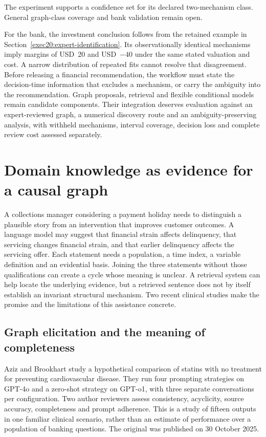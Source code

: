 The experiment supports a confidence set for its declared two-mechanism
class. General graph-class coverage and bank validation remain open.

For the bank, the investment conclusion follows from the retained example in
Section~\ref{exec20:expert-identification}. Its observationally identical
mechanisms imply margins of USD~20 and USD~$-40$ under the same stated
valuation and cost. A narrow distribution of repeated fits cannot resolve
that disagreement. Before releasing a financial recommendation, the workflow
must state the decision-time information that excludes a mechanism, or carry
the ambiguity into the recommendation. Graph proposals, retrieval and flexible
conditional models remain candidate components. Their integration deserves
evaluation against an expert-reviewed graph, a numerical discovery route and
an ambiguity-preserving analysis, with withheld mechanisms, interval coverage,
decision loss and complete review cost assessed separately.


\section{Domain knowledge as evidence for a causal graph}
\label{exec22:domain-scope}

A collections manager considering a payment holiday needs to distinguish a
plausible story from an intervention that improves customer outcomes. A language
model may suggest that financial strain affects delinquency, that servicing
changes financial strain, and that earlier delinquency affects the servicing
offer. Each statement needs a population, a time index, a variable definition
and an evidential basis. Joining the three statements without those qualifications
can create a cycle whose meaning is unclear. A retrieval system can help locate
the underlying evidence, but a retrieved sentence does not by itself establish
an invariant structural mechanism. Two recent clinical studies make the promise
and the limitations of this assistance concrete.

\subsection{Graph elicitation and the meaning of completeness}
\label{exec22:domain-elicitation}

Aziz and Brookhart study a hypothetical comparison of statins with no treatment
for preventing cardiovascular disease. They run four prompting strategies on
GPT-4o and a zero-shot strategy on GPT-o1, with three separate conversations per
configuration. Two author reviewers assess consistency, acyclicity, source
accuracy, completeness and prompt adherence. This is a study of fifteen outputs
in one familiar clinical scenario, rather than an estimate of performance over
a population of banking questions. The original was published on 30 October
2025. \cite{exec22_domain_aziz}

